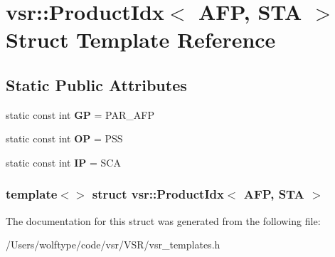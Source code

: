 \hypertarget{structvsr_1_1_product_idx_3_01_a_f_p_00_01_s_t_a_01_4}{\section{vsr\-:\-:Product\-Idx$<$ A\-F\-P, S\-T\-A $>$ Struct Template Reference}
\label{structvsr_1_1_product_idx_3_01_a_f_p_00_01_s_t_a_01_4}
}
\subsection*{Static Public Attributes}
\begin{DoxyCompactItemize}
\item 
\hypertarget{structvsr_1_1_product_idx_3_01_a_f_p_00_01_s_t_a_01_4_ab6ad015ddb4db432d4c115f4d8505676}{static const int {\bfseries G\-P} = P\-A\-R\-\_\-\-A\-F\-P}\label{structvsr_1_1_product_idx_3_01_a_f_p_00_01_s_t_a_01_4_ab6ad015ddb4db432d4c115f4d8505676}

\item 
\hypertarget{structvsr_1_1_product_idx_3_01_a_f_p_00_01_s_t_a_01_4_a93a8426831cc0504c16aae3f72550653}{static const int {\bfseries O\-P} = P\-S\-S}\label{structvsr_1_1_product_idx_3_01_a_f_p_00_01_s_t_a_01_4_a93a8426831cc0504c16aae3f72550653}

\item 
\hypertarget{structvsr_1_1_product_idx_3_01_a_f_p_00_01_s_t_a_01_4_a6b517bf8813e29daebd341739796a21c}{static const int {\bfseries I\-P} = S\-C\-A}\label{structvsr_1_1_product_idx_3_01_a_f_p_00_01_s_t_a_01_4_a6b517bf8813e29daebd341739796a21c}

\end{DoxyCompactItemize}
\subsubsection*{template$<$$>$ struct vsr\-::\-Product\-Idx$<$ A\-F\-P, S\-T\-A $>$}



The documentation for this struct was generated from the following file\-:\begin{DoxyCompactItemize}
\item 
/\-Users/wolftype/code/vsr/\-V\-S\-R/vsr\-\_\-templates.\-h\end{DoxyCompactItemize}
